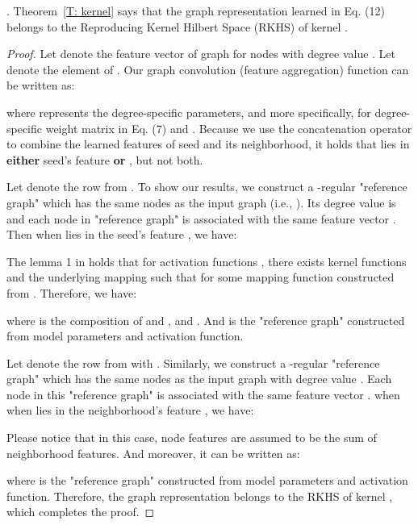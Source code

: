 \documentclass[sigconf]{acmart}
\begin{document}
.
Theorem~\ref{T: kernel} says that the graph representation  learned in Eq. (12) belongs to the Reproducing Kernel Hilbert Space (RKHS) of kernel .
\begin{proof}
Let  denote the feature vector of graph  for nodes with degree value . Let  denote the  element of . Our graph convolution (feature aggregation) function can be written as:

where  represents the degree-specific parameters, and more specifically,  for degree-specific weight matrix in Eq. (7) and . Because we use the concatenation operator  to combine the learned features of seed and its neighborhood, it holds that  lies in \textbf{either} seed's feature  \textbf{or} , but not both.

Let  denote the  row from . To show our results, we construct a -regular "reference graph"  which has the same nodes as the input graph  (i.e., ). Its degree value  is  and each node in "reference graph" is associated with the same feature vector . Then when  lies in the seed's feature , we have:


The lemma 1 in \cite{lei2017deriving} holds that for activation functions , there exists kernel functions  and the underlying mapping  such that  for some mapping function  constructed from . Therefore, we have:

where  is the composition of  and , and . And  is the "reference graph" constructed from model parameters and activation function.

Let  denote the  row from  with . Similarly, we construct a -regular "reference graph"  which has the same nodes as the input graph  with degree value . Each node in this "reference graph" is associated with the same feature vector .
when when  lies in the neighborhood's feature , we have:

Please notice that in this case, node features are assumed to be the sum of neighborhood features. And moreover, it can be written as:

where  is the "reference graph" constructed from model parameters and activation function.
Therefore, the graph representation  belongs to the RKHS of kernel , which completes the proof.
\end{proof}

















 
\end{document}
